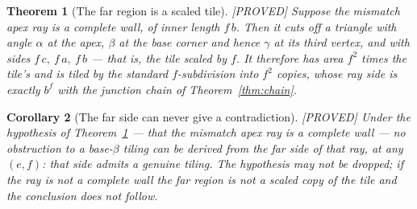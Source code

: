 \documentclass[11pt,reqno]{amsart}
\theoremstyle{plain}
\newtheorem{theorem}{Theorem}
\newtheorem{corollary}[theorem]{Corollary}
\theoremstyle{definition}
\newcommand{\lab}[1]{\hfill\textnormal{\footnotesize\textsc{[#1]}}}
\begin{document}
\begin{theorem}[The far region is a scaled tile]\label{thm:farregion}\lab{PROVED}
Suppose the mismatch apex ray is a complete wall, of inner length $f\,b$. Then it cuts off a triangle
with angle $\alpha$ at the apex, $\beta$ at the base corner and hence $\gamma$ at its third vertex,
and with sides $f\,c,\ f\,a,\ f\,b$ --- that is, \emph{the tile scaled by $f$}. It therefore has area
$f^2$ times the tile's and is tiled by the standard $f$-subdivision into $f^2$ copies, whose ray side
is exactly $b^{f}$ with the junction chain of Theorem~\ref{thm:chain}.
\end{theorem}

\begin{corollary}[The far side can never give a contradiction]\label{cor:farvacuous}\lab{PROVED}
\emph{Under the hypothesis of Theorem~\textup{\ref{thm:farregion}}} --- that the mismatch apex ray is
a complete wall --- no obstruction to a base-$\beta$ tiling can be derived from the far side of that
ray, at any $(e,f)$: that side admits a genuine tiling. The hypothesis may not be dropped; if the ray
is not a complete wall the far region is not a scaled copy of the tile and the conclusion does not
follow.
\end{corollary}
\end{document}
